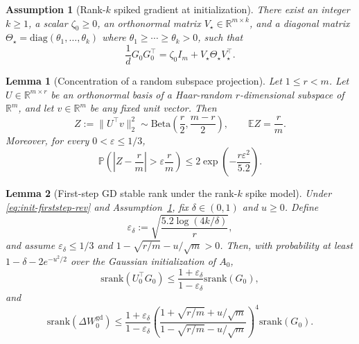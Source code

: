 \documentclass[10pt,a4paper]{amsart}
\newtheorem{assumption}{Assumption}
\newtheorem{lemma}{Lemma}
\newcommand{\diag}{\mathrm{diag}}
\newcommand{\srank}{\mathrm{srank}}
\begin{document}
\begin{assumption}[Rank-$k$ spiked gradient at initialization]
\label{assump:spike-init-rev}
There exist an integer $k\ge1$, a scalar $\zeta_0\ge0$, an orthonormal matrix $V_\star\in\mathbb R^{m\times k}$, and a diagonal matrix $\Theta_\star=\diag(\theta_1,\ldots,\theta_k)$ where $ \theta_1\ge\cdots\ge\theta_k>0$, such that
\begin{equation}
\label{eq:spike-init-rev}
\frac{1}{d}G_0G_0^\top
=
\zeta_0I_m+V_\star\Theta_\star V_\star^\top .
\end{equation}
\end{assumption}

\begin{lemma}[Concentration of a random subspace projection]
\label{lem:subspace-concentration-rev}
Let \(1\le r<m\). Let \(U\in\mathbb R^{m\times r}\) be an orthonormal basis
of a Haar-random \(r\)-dimensional subspace of \(\mathbb R^m\), and let
\(v\in\mathbb R^m\) be any fixed unit vector. Then
\[
Z:=\|U^\top v\|_2^2
\sim
\mathrm{Beta}\!\left(\frac{r}{2},\frac{m-r}{2}\right),
\qquad
\mathbb E Z=\frac{r}{m} .
\]
Moreover, for every \(0<\varepsilon\le 1/3\),
\[
\mathbb P\left(
\left|Z-\frac{r}{m}\right|>\varepsilon\frac{r}{m}
\right)
\le
2\exp\left(-\frac{r\varepsilon^2}{5.2}\right).
\]
\end{lemma}

\begin{lemma}[First-step GD stable rank under the rank-\(k\) spike model]
\label{lem:firststep-gd-rev}
Under \eqref{eq:init-firststep-rev} and Assumption~\ref{assump:spike-init-rev}, fix \(\delta\in(0,1)\) and \(u\ge0\). Define
\[
\varepsilon_\delta:=\sqrt{\frac{5.2\log(4k/\delta)}{r}},
\]
and assume \(\varepsilon_\delta\le 1/3\) and \(1-\sqrt{r/m}-u/\sqrt m>0\). Then, with probability at least \(1-\delta-2e^{-u^2/2}\) over the Gaussian initialization of \(A_0\),
\[
\srank(U_0^\top G_0)
\le
\frac{1+\varepsilon_\delta}{1-\varepsilon_\delta}\srank(G_0),
\]
and
\[
\srank(\Delta W_0^{\mathrm{gd}})
\le
\frac{1+\varepsilon_\delta}{1-\varepsilon_\delta}
\left(
\frac{1+\sqrt{r/m}+u/\sqrt m}{1-\sqrt{r/m}-u/\sqrt m}
\right)^4
\srank(G_0).
\]
\end{lemma}
\end{document}
